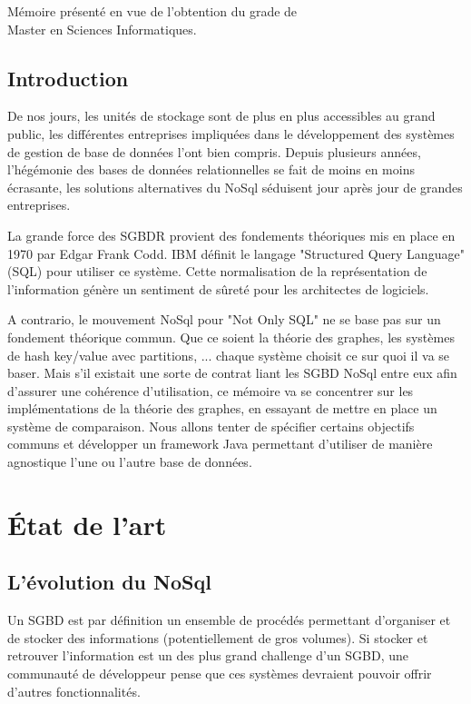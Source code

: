 \documentclass[a4paper,fleqn,12pt]{report}
\begin{document}
\vspace{0.5cm}
\begin{center}
M\'emoire pr\'esent\'e en vue de l'obtention du grade de\\
Master en Sciences Informatiques.
\end{center}
\tableofcontents
\newpage


\chapter*{Introduction}

De nos jours, les unités de stockage sont de plus en plus accessibles au grand public, les différentes entreprises impliquées dans le développement des systèmes de gestion de base de données l'ont bien compris. Depuis plusieurs années, l'hégémonie des bases de données relationnelles se fait de moins en moins écrasante, les solutions alternatives du NoSql séduisent jour après jour de grandes entreprises. 

La grande force des SGBDR provient des fondements théoriques mis en place en 1970 par Edgar Frank Codd. IBM définit le langage "Structured Query Language" (SQL) pour utiliser ce système. Cette normalisation de la représentation de l'information génère un sentiment de sûreté pour les architectes de logiciels.

A contrario, le mouvement NoSql pour "Not Only SQL" ne se base pas sur un fondement théorique commun. Que ce soient la théorie des graphes, les systèmes de hash key/value avec partitions, ... chaque système choisit ce sur quoi il va se baser. Mais s'il existait une sorte de contrat liant les SGBD NoSql entre eux afin d'assurer une cohérence d'utilisation, ce mémoire va se concentrer sur les implémentations de la théorie des graphes, en essayant de mettre en place un système de comparaison. Nous allons tenter de spécifier certains objectifs communs et développer un framework Java permettant d'utiliser de manière agnostique l'une ou l'autre base de données.
 
\part{État de l'art}

\chapter{L'évolution du NoSql}
\label{NoSqlEvol}

Un SGBD est par définition un ensemble de procédés permettant d'organiser et de stocker des informations (potentiellement de gros volumes). Si stocker et retrouver l'information est un des plus grand challenge d'un SGBD, une communauté de développeur pense que ces systèmes devraient pouvoir offrir d'autres fonctionnalités. 
\end{document}
